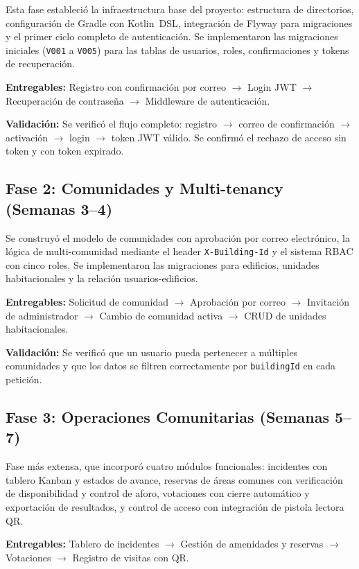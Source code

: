 Esta fase estableció la infraestructura base del proyecto: estructura de directorios, configuración de Gradle con Kotlin~DSL, integración de Flyway para migraciones y el primer ciclo completo de autenticación. Se implementaron las migraciones iniciales (\texttt{V001} a \texttt{V005}) para las tablas de usuarios, roles, confirmaciones y tokens de recuperación.

\textbf{Entregables:} Registro con confirmación por correo $\rightarrow$ Login JWT $\rightarrow$ Recuperación de contraseña $\rightarrow$ Middleware de autenticación.

\textbf{Validación:} Se verificó el flujo completo: registro $\rightarrow$ correo de confirmación $\rightarrow$ activación $\rightarrow$ login $\rightarrow$ token JWT válido. Se confirmó el rechazo de acceso sin token y con token expirado.

\subsection{Fase 2: Comunidades y Multi-tenancy (Semanas 3--4)}

Se construyó el modelo de comunidades con aprobación por correo electrónico, la lógica de multi-comunidad mediante el header \texttt{X-Building-Id} y el sistema RBAC con cinco roles. Se implementaron las migraciones para edificios, unidades habitacionales y la relación usuarios-edificios.

\textbf{Entregables:} Solicitud de comunidad $\rightarrow$ Aprobación por correo $\rightarrow$ Invitación de administrador $\rightarrow$ Cambio de comunidad activa $\rightarrow$ CRUD de unidades habitacionales.

\textbf{Validación:} Se verificó que un usuario pueda pertenecer a múltiples comunidades y que los datos se filtren correctamente por \texttt{buildingId} en cada petición.

\subsection{Fase 3: Operaciones Comunitarias (Semanas 5--7)}

Fase más extensa, que incorporó cuatro módulos funcionales: incidentes con tablero Kanban y estados de avance, reservas de áreas comunes con verificación de disponibilidad y control de aforo, votaciones con cierre automático y exportación de resultados, y control de acceso con integración de pistola lectora QR.

\textbf{Entregables:} Tablero de incidentes $\rightarrow$ Gestión de amenidades y reservas $\rightarrow$ Votaciones $\rightarrow$ Registro de visitas con QR.

